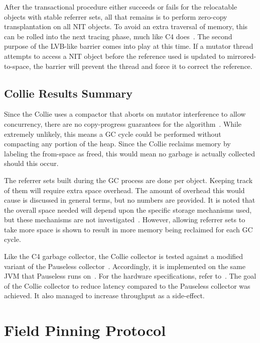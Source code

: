 \documentclass{sig-alternate}
\begin{document}
After the transactional procedure either succeeds or fails for the 
relocatable objects with stable referrer sets, all that remains is to perform zero-copy transplantation
on all NIT objects. To avoid an extra traversal of memory, this can be rolled into the next tracing
phase, much like C4 does~\cite{Tene:C4}. The second purpose of the LVB-like barrier comes into play
at this time. If a mutator thread attempts to access a NIT object before the 
reference used is updated to mirrored-to-space, the barrier will prevent the thread and force it to 
correct the reference.


\subsection{Collie Results Summary}
\label{sec:collieResults}

Since the Collie uses a compactor that aborts on mutator interference to allow
concurrency, there are no copy-progress guarantees for the algorithm~\cite{Osterlund:FPP}.
While extremely unlikely, this means a GC cycle could be performed without compacting
any portion of the heap. Since the Collie reclaims memory by labeling the from-space as freed,
this would mean no garbage is actually collected should this occur.

The referrer sets built during the GC process are done per object. Keeping track of them
will require extra space overhead. The amount of overhead this would cause is discussed in
general terms, but no numbers are provided. It is noted that the overall space needed will 
depend upon the specific storage mechanisms used, but these mechanisms are not 
investigated~\cite{Iyengar:Collie}. However, allowing referrer sets to take
more space is shown to result in more memory being reclaimed for each GC cycle.

Like the C4 garbage collector, the Collie collector is tested against a modified
variant of the Pauseless collector~\cite{Iyengar:Collie}. Accordingly, it is 
implemented on the same JVM that Pauseless runs on~\cite{Click:Pauseless}. For the 
hardware specifications, refer to~\cite{Iyengar:Collie}. The goal of the Collie 
collector to reduce latency compared to the Pauseless collector was achieved. 
It also managed to increase throughput as a side-effect. 



\section{Field Pinning Protocol}
\label{sec:fpp}
\end{document}
